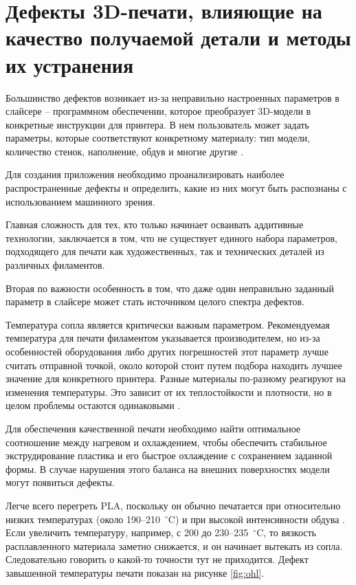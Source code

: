 \section{Дефекты 3D-печати, влияющие на качество получаемой детали и методы их устранения}

Большинство дефектов возникает из-за неправильно настроенных параметров в слайсере -- программном обеспечении, которое преобразует 3D-модели в конкретные инструкции для принтера. В нем пользователь может задать параметры, которые соответствуют конкретному материалу: тип модели, количество стенок, наполнение, обдув и многие другие \cite{ивашкова2017анализ,gunaydin2018common}. 

Для создания приложения необходимо проанализировать наиболее распространенные дефекты и определить, какие из них могут быть распознаны с использованием машинного зрения.

Главная сложность для тех, кто только начинает осваивать аддитивные технологии, заключается в том, что не существует единого набора параметров, подходящего для печати как художественных, так и технических деталей из различных филаментов. 

Вторая по важности особенность в том, что даже один неправильно заданный параметр в слайсере может стать источником целого спектра дефектов. 

Температура сопла является критически важным параметром. Рекомендуемая температура для печати филаментом указывается производителем, но из-за особенностей оборудования либо других погрешностей этот параметр лучше считать отправной точкой, около которой стоит путем подбора находить лучшее значение для конкретного принтера. Разные материалы по-разному реагируют на изменения температуры. Это зависит от их теплостойкости и плотности, но в целом проблемы остаются одинаковыми \cite{мартиросов2022дефекты}.

Для обеспечения качественной печати необходимо найти оптимальное соотношение между нагревом и охлаждением, чтобы обеспечить стабильное экструдирование пластика и его быстрое охлаждение с сохранением заданной формы. В случае нарушения этого баланса на внешних поверхностях модели могут появиться дефекты.

Легче всего перегреть PLA, поскольку он обычно печатается при относительно низких температурах (около 190–210~$^{\circ}$C) и при высокой интенсивности обдува \cite{camargo2019mechanical}. Если увеличить температуру, например, с 200 до 230–235~$^{\circ}$C, то вязкость расплавленного материала заметно снижается, и он начинает вытекать из сопла. Следовательно говорить о какой-то точности тут не приходится. Дефект завышенной температуры печати показан на рисунке \ref{fig:ohl}.

